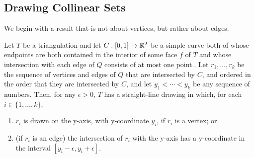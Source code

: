 \documentclass{patmorin}
\begin{document}
\subsection{Drawing Collinear Sets}

We begin with a result that is not about vertices, but rather about edges.

\begin{thm}
   Let $T$ be a triangulation and let $C:[0,1]\to\mathbb{R}^2$ be a simple curve
   both of whose endpoints are both contained in the interior of some
   face $f$ of $T$ and whose intersection with each edge of $Q$ consists
   of at most one point.. Let $r_1,\ldots,r_k$ be the sequence of
   vertices and edges of $Q$ that are intersected by $C$, and ordered in
   the order that they are intersected by $C$, and let $y_1<\cdots<y_k$
   be any sequence of numbers.  Then, for any $\epsilon>0$, $T$ has a
   straight-line drawing in which,
   for each $i\in\{1,\ldots,k\}$, 
   \begin{enumerate}
       \item $r_i$ is drawn on the y-axis, with y-coordinate $y_i$,
         if $r_i$ is a vertex; or
       \item (if $r_i$ is an edge) the intersection of $r_i$ with the
         y-axis has a y-coordinate in the interval
         $[y_i-\epsilon,y_i+\epsilon]$.
   \end{enumerate}
\end{thm}
\end{document}
